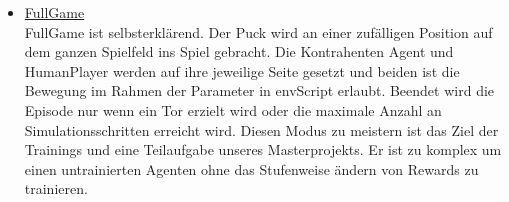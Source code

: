 \begin{itemize}
\item \underline{FullGame} \\
FullGame ist selbsterklärend. Der Puck wird an einer zufälligen Position auf dem ganzen Spielfeld ins Spiel gebracht. Die Kontrahenten Agent und HumanPlayer werden auf ihre jeweilige Seite gesetzt und beiden ist die Bewegung im Rahmen der Parameter in envScript erlaubt. Beendet wird die Episode nur wenn ein Tor erzielt wird oder die maximale Anzahl an Simulationsschritten erreicht wird. Diesen Modus zu meistern ist das Ziel der Trainings und eine Teilaufgabe unseres Masterprojekts. Er ist zu komplex um einen untrainierten Agenten ohne das Stufenweise ändern von Rewards zu trainieren.
\end{itemize}


